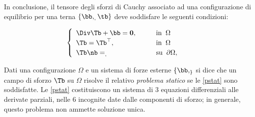 \vspace{.2cm}
In conclusione, il tensore degli sforzi di Cauchy associato ad una configurazione di equilibrio per una terna $\{\bb, \sb, \tb\}$ deve soddisfare le seguenti condizioni:
\begin{definition}
	\begin{equation}\label{pstat}
	\begin{cases}
		\begin{array}{ll}
			\Div\Tb +\bb= \mathbf{0}, & \qquad \text{in}\;\; \Omega \\
			\Tb=\Tb^\top,  & \qquad \text{in}\;\; \Omega \\
			\Tb\nb=\sb, & \qquad \text{su}\;\; \partial\Omega,
		\end{array}
	\end{cases}
\end{equation}
\end{definition}

Dati una configurazione $\Omega$ e un sistema di forze esterne $\{\bb, \sb\}$ si dice che un campo di sforzo $\Tb$ su $\Omega$ risolve il relativo \textit{problema statico} se le \eqref{pstat}  sono soddisfatte. Le \eqref{pstat}  costituiscono un sistema di 3 equazioni differenziali alle derivate parziali, nelle 6 incognite date dalle componenti di sforzo; in generale, questo problema non ammette soluzione unica.




